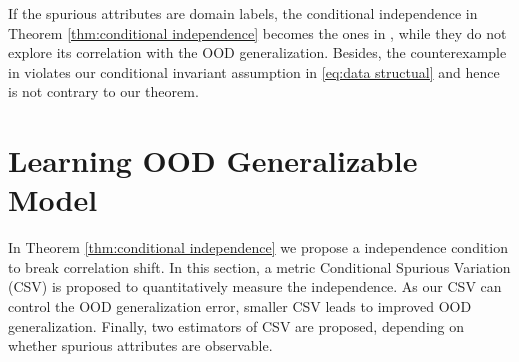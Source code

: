 \documentclass{article} %
\newcommand{\mE}{\mathbb{E}}
\newcommand{\cL}{\mathcal{L}}
\newcommand{\cP}{\mathcal{P}}
\begin{document}
	
	
	\begin{remark}
		If the spurious attributes are domain labels, the conditional independence in Theorem \ref{thm:conditional independence} becomes the ones in \citep{liu2015deep,hu2020domain,mahajan2021domain}, while they do not explore its correlation with the OOD generalization. Besides, the counterexample in \cite{mahajan2021domain} violates our conditional invariant assumption in \eqref{eq:data structual} and hence is not contrary to our theorem.
	\end{remark}
	\section{Learning OOD Generalizable Model}\label{sec:learning OOD generalizable model}
	In Theorem \ref{thm:conditional independence} we propose a independence condition to break correlation shift. In this section, a metric Conditional Spurious Variation (CSV) is proposed to quantitatively measure the independence. As our CSV can control the OOD generalization error, smaller CSV leads to improved OOD generalization. Finally, two estimators of CSV are proposed, depending on whether spurious attributes are observable. 
	
\end{document}
